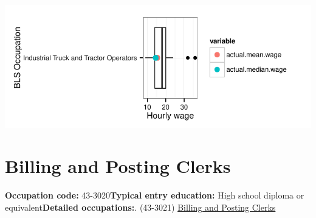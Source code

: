 \documentclass[a4paper,10pt]{article}\usepackage[]{graphicx}\usepackage[]{color}
\makeatletter
\def\maxwidth{ %
  \ifdim\Gin@nat@width>\linewidth
    \linewidth
  \else
    \Gin@nat@width
  \fi
}
\makeatother
\begin{document}
{\centering \includegraphics[width=\maxwidth]{figure/unnamed-chunk-268} 

}


\newpage\section{Billing and Posting Clerks}\textbf{Occupation code:} 43-3020\newline\textbf{Typical entry education:} High school diploma or equivalent\newline\textbf{Detailed occupations:}. (43-3021)  \href{http://www.bls.gov/oes/current/oes433021.htm}{Billing and Posting Clerks}\newline%
\end{document}
